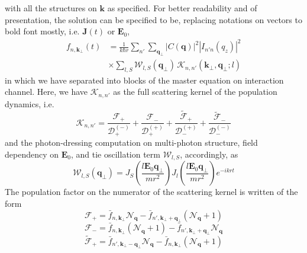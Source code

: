 \documentclass[%
 reprint,
 amsmath,amssymb,
 aps,
]{revtex4-2}
\begin{document}
with all the structures on $\mathbf{k}$ as specified. For better readability and of presentation, the solution can be specified to be, replacing notations on vectors to bold font mostly, i.e. $\mathbf{J}(t)$ or $\mathbf{E}_{0}$,
\begin{equation}
\begin{split}
f_{n,\mathbf{k}_{\perp}}(t)
&=
\frac{1}{k\hbar r}
\sum_{n'}
\sum_{\mathbf{q}_{\perp}}
\left|C(\mathbf{q})\right|^2
\left|I_{n'n}(q_z)\right|^2\\
&\times \sum_{l,S}
\mathcal{W}_{l,S}(\mathbf{q}_{\perp})
\,
\mathcal{K}_{n,n'}(\mathbf{k}_{\perp},\mathbf{q}_{\perp};l)
\end{split}
\end{equation}
in which we have separated into blocks of the master equation on interaction channel. Here, we have $\mathcal{K}_{n,n'}$ as the full scattering kernel of the population dynamics, i.e. 
\begin{equation}
\mathcal{K}_{n,n'}
=
\frac{\mathcal{F}_{+}}
{\mathcal{D}_{+}^{(-)}}
+
\frac{\mathcal{F}_{-}}
{\mathcal{D}_{+}^{(+)}}
+
\frac{\widetilde{\mathcal{F}}_{+}}
{\mathcal{D}_{-}^{(+)}}
+
\frac{\widetilde{\mathcal{F}}_{-}}
{\mathcal{D}_{-}^{(-)}}
\end{equation}
and the photon-dressing computation on multi-photon structure, field dependency on $\mathbf{E}_{0}$, and tie oscillation term $\mathcal{W}_{l,S}$, accordingly, as
\begin{equation}
\mathcal{W}_{l,S}(\mathbf{q}_{\perp})
=
J_S\!\left(\frac{l\mathbf{E}_0\mathbf{q}_{\perp}}{mr^2}\right)
J_l\!\left(\frac{l\mathbf{E}_0\mathbf{q}_{\perp}}{mr^2}\right)
e^{-ikrt}
\end{equation}
The population factor on the numerator of the scattering kernel is written of the form
\begin{equation}
\mathcal{F}_{+}
=
\bar f_{n,\mathbf{k}_{\perp}}\mathcal N_{\mathbf q}
-
\bar f_{n',\mathbf{k}_{\perp}+\mathbf q_{\perp}}
(\mathcal N_{\mathbf q}+1)
\end{equation}
\begin{equation}
\mathcal{F}_{-}
=
\bar f_{n,\mathbf{k}_{\perp}}(\mathcal N_{\mathbf q}+1)
-
\bar f_{n',\mathbf{k}_{\perp}+\mathbf q_{\perp}}
\mathcal N_{\mathbf q}
\end{equation}
\begin{equation}
\widetilde{\mathcal{F}}_{+}
=
\bar f_{n',\mathbf{k}_{\perp}-\mathbf q_{\perp}}
\mathcal N_{\mathbf q}
-
\bar f_{n,\mathbf{k}_{\perp}}
(\mathcal N_{\mathbf q}+1)
\end{equation}
\end{document}
